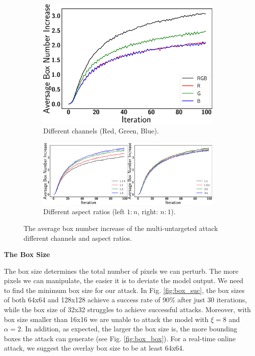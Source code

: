 \begin{figure}[t]
    \centering
    \begin{subfigure}[b]{0.3\textwidth}
        \includegraphics[width=\linewidth]{figures/chapter_detection/detection/multi_untargeted_mono_box.png}
        \caption{Different channels (Red, Green, Blue).}
         \label{fig:mono_box}
    \end{subfigure}
    \begin{subfigure}[b]{0.6\textwidth}
        \includegraphics[width=1\linewidth]{figures/chapter_detection/detection/multi_untargeted_aspect_box.png}
        \caption{Different aspect ratios (left $1:n$, right: $n:1$).}
         \label{fig:aspect_box}
    \end{subfigure}

    \caption{The average box number increase of the multi-untargeted attack different channels and aspect ratios.}
\end{figure}

\textbf{The Box Size}

The box size determines the total number of pixels we can perturb. The more pixels we can manipulate, the easier it is to deviate the model output. We need to find the minimum box size for our attack. In Fig. \ref{fig:box_suc}, the box sizes of both 64x64 and 128x128 achieve a success rate of 90\% after just 30 iterations, while the box size of 32x32 struggles to achieve successful attacks. Moreover, with box size smaller than 16x16 we are unable to attack the model with $\xi=8$ and $\alpha=2$. In addition, as expected, the larger the box size is, the more bounding boxes the attack can generate (see Fig. \ref{fig:box_box}). For a real-time online attack, we suggest the overlay box size to be at least 64x64.


